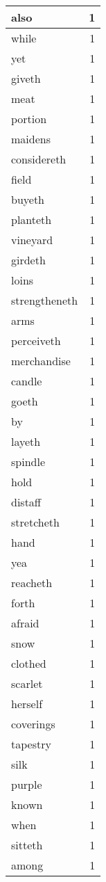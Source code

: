 \begin{center}
\begin{longtable}{l|r}
also & 1\\ \hline 
while & 1\\ \hline 
yet & 1\\ \hline 
giveth & 1\\ \hline 
meat & 1\\ \hline 
portion & 1\\ \hline 
maidens & 1\\ \hline 
considereth & 1\\ \hline 
field & 1\\ \hline 
buyeth & 1\\ \hline 
planteth & 1\\ \hline 
vineyard & 1\\ \hline 
girdeth & 1\\ \hline 
loins & 1\\ \hline 
strengtheneth & 1\\ \hline 
arms & 1\\ \hline 
perceiveth & 1\\ \hline 
merchandise & 1\\ \hline 
candle & 1\\ \hline 
goeth & 1\\ \hline 
by & 1\\ \hline 
layeth & 1\\ \hline 
spindle & 1\\ \hline 
hold & 1\\ \hline 
distaff & 1\\ \hline 
stretcheth & 1\\ \hline 
hand & 1\\ \hline 
yea & 1\\ \hline 
reacheth & 1\\ \hline 
forth & 1\\ \hline 
afraid & 1\\ \hline 
snow & 1\\ \hline 
clothed & 1\\ \hline 
scarlet & 1\\ \hline 
herself & 1\\ \hline 
coverings & 1\\ \hline 
tapestry & 1\\ \hline 
silk & 1\\ \hline 
purple & 1\\ \hline 
known & 1\\ \hline 
when & 1\\ \hline 
sitteth & 1\\ \hline 
among & 1\\ \hline 

\end{longtable}
\end{center}
